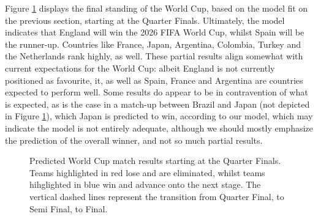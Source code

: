 \documentclass[12pt,paper=letter,leqno]{scrartcl}
\begin{document}
Figure \ref{fig:matchup} displays the final standing of the World Cup, based on the model fit on the previous section, starting at the Quarter Finals. Ultimately, the model indicates that England will win the 2026 FIFA World Cup, whilst Spain will be the runner-up. Countries like France, Japan, Argentina, Colombia, Turkey and the Netherlands rank highly, as well. These partial results align somewhat with current expectations for the World Cup: albeit England is not currently positioned as favourite, it, as well as Spain, France and Argentina are countries expected to perform well. Some results do appear to be in contravention of what is expected, as is the case in a match-up between Brazil and Japan (not depicted in Figure \ref{fig:matchup}), which Japan is predicted to win, according to our model, which may indicate the model is not entirely adequate, although we should mostly emphasize the prediction of the overall winner, and not so much partial results.

\begin{figure}
    \centering
    \caption{Predicted World Cup match results starting at the Quarter Finals. Teams highlighted in red lose and are eliminated, whilst teams hihglighted in blue win and advance onto the next stage. The vertical dashed lines represent the transition from Quarter Final, to Semi Final, to Final.}
    \label{fig:matchup}
\end{figure}
\end{document}
